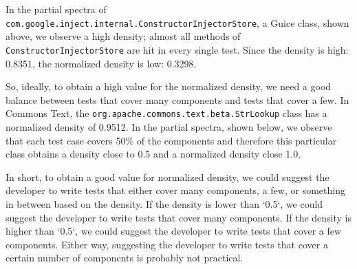 \documentclass[twoside,a4paper,11pt]{memoir}
\begin{document}
In the partial spectra of \texttt{com.google.inject.internal.Constructor\-Injector\-Store}, a Guice class, shown above, we observe a high density; almost all methods of \texttt{Constructor\-Injector\-Store} are hit in every single test.
Since the density is high: 0.8351, the normalized density is low: 0.3298.

So, ideally, to obtain a high value for the normalized density, we need a good balance between tests that cover many components and tests that cover a few.
In Commons Text, the \texttt{org.apache.commons.text.beta.StrLookup} class has a normalized density of 0.9512.
In the partial spectra, shown below, we observe that each test case covers 50\% of the components and therefore this particular class obtains a density close to 0.5 and a normalized density close 1.0.

\begin{table}[]
\scriptsize
\centering
\caption{My caption}
\label{my-label}
\noindent{}
\end{table}

In short, to obtain a good value for normalized density, we could suggest the developer to write tests that either cover many components, a few, or something in between based on the density.
If the density is lower than `0.5`, we could suggest the developer to write tests that cover many components.
If the density is higher than `0.5`, we could suggest the developer to write tests that cover a few components.
Either way, suggesting the developer to write tests that cover a certain number of components is probably not practical.
\end{document}
